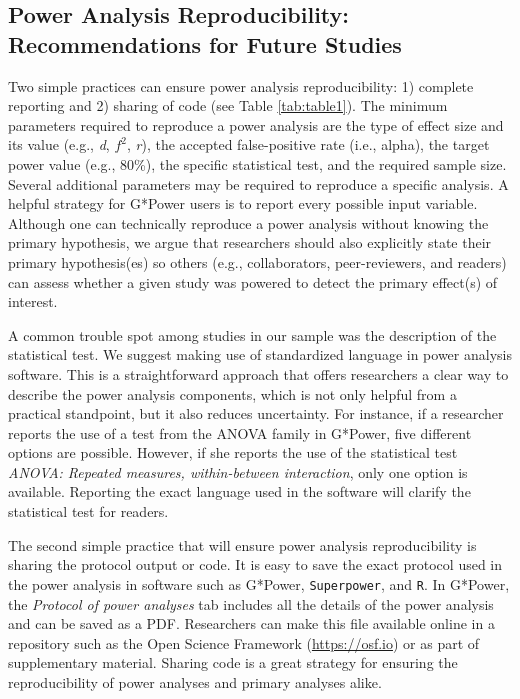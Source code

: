 \documentclass[
  man, donotrepeattitle,mask,floatsintext]{apa7}
\begin{document}
\hypertarget{power-analysis-reproducibility-recommendations-for-future-studies}{%
\subsection{Power Analysis Reproducibility: Recommendations for Future Studies}\label{power-analysis-reproducibility-recommendations-for-future-studies}}

Two simple practices can ensure power analysis reproducibility: 1) complete reporting and 2) sharing of code (see Table \ref{tab:table1}). The minimum parameters required to reproduce a power analysis are the type of effect size and its value (e.g., \emph{d}, \(f^2\), \emph{r}), the accepted false-positive rate (i.e., alpha), the target power value (e.g., 80\%), the specific statistical test, and the required sample size. Several additional parameters may be required to reproduce a specific analysis. A helpful strategy for G*Power users is to report every possible input variable. Although one can technically reproduce a power analysis without knowing the primary hypothesis, we argue that researchers should also explicitly state their primary hypothesis(es) so others (e.g., collaborators, peer-reviewers, and readers) can assess whether a given study was powered to detect the primary effect(s) of interest.

A common trouble spot among studies in our sample was the description of the statistical test. We suggest making use of standardized language in power analysis software. This is a straightforward approach that offers researchers a clear way to describe the power analysis components, which is not only helpful from a practical standpoint, but it also reduces uncertainty. For instance, if a researcher reports the use of a test from the ANOVA family in G*Power, five different options are possible. However, if she reports the use of the statistical test \emph{ANOVA: Repeated measures, within-between interaction}, only one option is available. Reporting the exact language used in the software will clarify the statistical test for readers.

The second simple practice that will ensure power analysis reproducibility is sharing the protocol output or code. It is easy to save the exact protocol used in the power analysis in software such as G*Power, \texttt{Superpower}, and \texttt{R}. In G*Power, the \emph{Protocol of power analyses} tab includes all the details of the power analysis and can be saved as a PDF. Researchers can make this file available online in a repository such as the Open Science Framework (\url{https://osf.io}) or as part of supplementary material. Sharing code is a great strategy for ensuring the reproducibility of power analyses and primary analyses alike.
\end{document}
